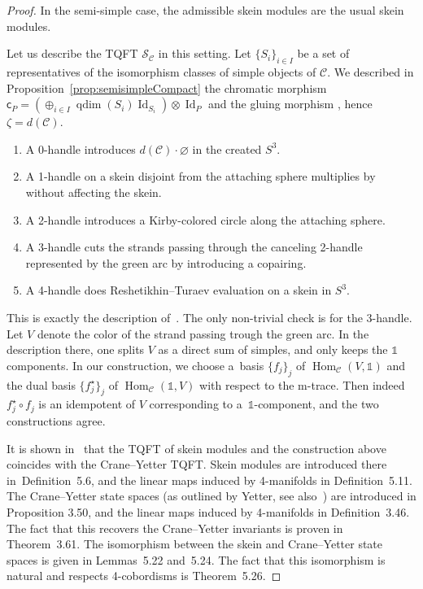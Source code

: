 \documentclass[pdftex]{sigma}
\numberwithin{equation}{section}
\newcommand{\chr}{{\mathsf{c}}}
\newcommand{\gm}{{\mathsf{g}}}
\numberwithin{theorem}{section}
\numberwithin{proposition}{section}
\numberwithin{definition}{section}
\numberwithin{lemma}{section}
\numberwithin{corollary}{section}
\numberwithin{remark}{section}
\numberwithin{example}{section}
\newcommand{\cat}{\mathcal{C}}
\newcommand{\Hom}{\operatorname{Hom}}
\newcommand{\unit}{\ensuremath{\mathds{1}}}
\newcommand{\Id}{\operatorname{Id}}
\newcommand{\qdim}{\operatorname{qdim}}
\newcommand{\TSkein}{{\mathscr{S}}}
\begin{document}
\begin{proof}
In the semi-simple case, the admissible skein modules are the usual skein modules.

Let us describe the TQFT $\TSkein_\cat$ in this setting. Let $\{S_i\}_{i\in I}$ be a set of representatives of the isomorphism classes of simple objects of $\cat$. We described in Proposition~\ref{prop:semisimpleCompact} the chromatic morphism $\chr_P=(\oplus_{i\in I} \qdim(S_i)\Id_{S_i})\otimes \Id_P$ and the gluing morphism \smash{$\gm=\frac{1}{d(\cat)}\Id_\unit$}, hence $\zeta = d(\cat)$.
\begin{enumerate}\itemsep=0pt
\item[0.] A 0-handle introduces $d(\cat)\cdot\varnothing$ in the created $S^3$.
\item[1.] A 1-handle on a skein disjoint from the attaching sphere multiplies by \smash{$\frac{1}{d(\cat)}$} without affecting the skein.
\item[2.] A 2-handle introduces a Kirby-colored circle along the attaching sphere.
\item[3.] A 3-handle cuts the strands passing through the canceling 2-handle represented by the green arc by introducing a copairing.
\item[4.] A 4-handle does Reshetikhin--Turaev evaluation on a skein in $S^3$.
\end{enumerate}
This is exactly the description of~\cite[Definition~5.11]{Tham21}. The only non-trivial check is for the 3-handle. Let $V$ denote the color of the strand passing trough the green arc. In the description there, one splits $V$ as a direct sum of simples, and only keeps the $\unit$ components. In our construction, we choose a~basis $\{f_j\}_j$ of $\Hom_\cat(V,\unit)$ and the dual basis $\bigl\{f_j^\star\bigr\}_j$ of $\Hom_\cat(\unit,V)$ with respect to the
m-trace.
Then indeed $f_j^\star\circ f_j$ is an idempotent of $V$ corresponding to a~$\unit$-component, and the two constructions agree.

It is shown in~\cite[Sections 5.2 and 3.4]{Tham21} that the TQFT of skein modules and the construction above coincides with the Crane--Yetter TQFT. Skein modules are introduced there in~Definition~5.6, and the linear maps induced by 4-manifolds in Definition~5.11. The Crane--Yetter state spaces (as outlined by Yetter, see also~\cite[Section 7.1]{BB18}) are introduced in Proposition 3.50, and the linear maps induced by 4-manifolds in Definition~3.46. The fact that this recovers the Crane--Yetter invariants is proven in Theorem~3.61. The isomorphism between the skein and Crane--Yetter state spaces is given in Lemmas~5.22 and~5.24. The fact that this isomorphism is natural and respects 4-cobordisms is Theorem~5.26.
\end{proof}
\end{document}
